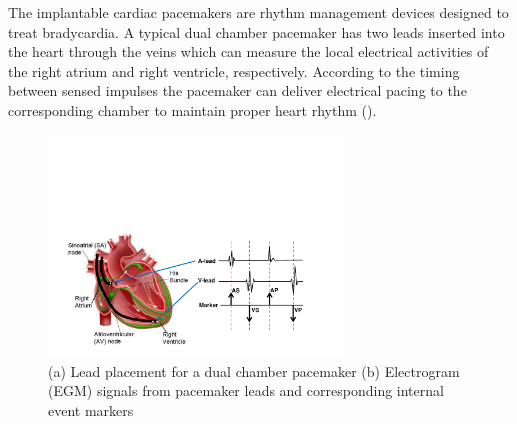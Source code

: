 The implantable cardiac pacemakers are rhythm management devices designed to treat bradycardia. A typical dual chamber pacemaker has two leads inserted into the heart through the veins which can measure the local electrical activities of the right atrium and right ventricle, respectively. According to the timing between sensed impulses the pacemaker can deliver electrical pacing to the corresponding chamber to maintain proper heart rhythm ().  
\begin{figure}[!t]
	\centering
	\includegraphics[width=0.7\textwidth]{figs/egm.pdf}
	
	\caption{\small (a) Lead placement for a dual chamber pacemaker (b) Electrogram (EGM) signals from pacemaker leads and corresponding internal event markers}
	\label{fig:probes}
\end{figure} 



